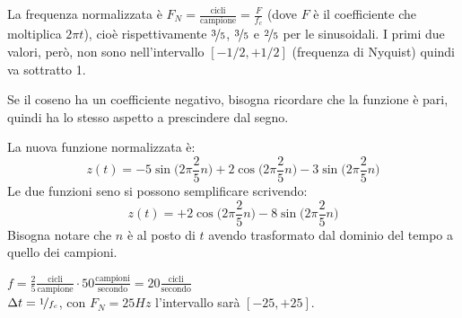 La frequenza normalizzata è $F_N = \frac{\text{cicli}}{\text{campione}} = \frac{F}{f_c}$ (dove $F$ è il coefficiente che moltiplica $2\pi t$), cioè rispettivamente $\nicefrac{3}{5}$, $\nicefrac{3}{5}$ e $\nicefrac{2}{5}$ per le sinusoidali. I primi due valori, però, non sono nell'intervallo $[-1/2, +1/2]$ (frequenza di Nyquist) quindi va sottratto 1. 

Se il coseno ha un coefficiente negativo, bisogna ricordare che la funzione è pari, quindi ha lo stesso aspetto a prescindere dal segno.

La nuova funzione normalizzata è:
$$z(t) = -5\sin\Big(2\pi \frac{2}{5}n\Big) + 2\cos\Big(2\pi \frac{2}{5}n\Big) - 3\sin\Big(2\pi \frac{2}{5}n\Big)$$
Le due funzioni seno si possono semplificare scrivendo: 
$$z(t) = +2\cos\Big(2\pi \frac{2}{5}n\Big) - 8\sin\Big(2\pi \frac{2}{5}n\Big)$$
Bisogna notare che $n$ è al posto di $t$ avendo trasformato dal dominio del tempo a quello dei campioni. 

$f = \frac{2}{5} \frac{\text{cicli}}{\text{campione}} \cdot 50 \frac{\text{campioni}}{\text{secondo}} = 20 \frac{\text{cicli}}{\text{secondo}}$ \\
$\Delta t = \nicefrac{1}{f_c}$, con $F_N = 25Hz$ l'intervallo sarà $[-25, +25]$.


